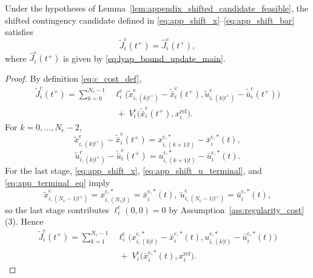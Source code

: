 \documentclass[twocolumn]{autart}
\begin{document}
\begin{lemma}
\label{lem:appendix_shifted_cost_identity}
Under the hypotheses of Lemma~\ref{lem:appendix_shifted_candidate_feasible}, the shifted contingency candidate defined in
\eqref{eq:app_shift_x}--\eqref{eq:app_shift_bar} satisfies
\begin{equation}
\tilde J_i^{\mathrm c}(t^+)
=
\hat J_i^{\mathrm c}(t^+),
\label{eq:app_candidate_equals_bound}
\end{equation}
where $\hat J_i^{\mathrm c}(t^+)$ is given by \eqref{eq:lyap_bound_update_main}.
\end{lemma}

\begin{proof}
By definition \eqref{eq:c_cost_def},
\begin{equation}
\begin{aligned}
\tilde J_i^{\mathrm c}(t^+)
=
\sum_{k=0}^{N_{\mathrm c}-1}
&\ell_i^{\mathrm c}\!\Big(
\tilde x_{i,(k|t^+)}^{\mathrm c}-\tilde{\bar x}_i^{\mathrm c}(t^+),
\tilde u_{i,(k|t^+)}^{\mathrm c}-\tilde{\bar u}_i^{\mathrm c}(t^+)
\Big)
\\
&\;+\;
V_i^{\mathrm c}\!\bigl(\tilde{\bar x}_i^{\mathrm c}(t^+),x_i^{\mathrm{ref}}\bigr).
\end{aligned}
\label{eq:app_shifted_candidate_cost}
\end{equation}
For $k=0,\dots,N_{\mathrm c}-2$,
\[
\tilde x_{i,(k|t^+)}^{\mathrm c}-\tilde{\bar x}_i^{\mathrm c}(t^+)
=
x_{i,(k+1|t)}^{\mathrm c,\ast}-\bar x_i^{\mathrm c,\ast}(t),
\]
\[
\tilde u_{i,(k|t^+)}^{\mathrm c}-\tilde{\bar u}_i^{\mathrm c}(t^+)
=
u_{i,(k+1|t)}^{\mathrm c,\ast}-\bar u_i^{\mathrm c,\ast}(t).
\]
For the last stage, \eqref{eq:app_shift_x}, \eqref{eq:app_shift_u_terminal}, and \eqref{eq:app_terminal_eq} imply
\[
\tilde x_{i,(N_{\mathrm c}-1|t^+)}^{\mathrm c}
=
x_{i,(N_{\mathrm c}|t)}^{\mathrm c,\ast}
=
\bar x_i^{\mathrm c,\ast}(t),
\ 
\tilde u_{i,(N_{\mathrm c}-1|t^+)}^{\mathrm c}
=
\bar u_i^{\mathrm c,\ast}(t),
\]
so the last stage contributes
\(
\ell_i^{\mathrm c}(0,0)=0
\)
by Assumption~\ref{ass:regularity_cost}(3). Hence
\begin{equation}
\begin{aligned}
\tilde J_i^{\mathrm c}(t^+)
=
\sum_{k=1}^{N_{\mathrm c}-1}
&\ell_i^{\mathrm c}\!\Big(
x_{i,(k|t)}^{\mathrm c,\ast}-\bar x_i^{\mathrm c,\ast}(t),
u_{i,(k|t)}^{\mathrm c,\ast}-\bar u_i^{\mathrm c,\ast}(t)
\Big)
\\
&\;+\;
V_i^{\mathrm c}\!\bigl(\bar x_i^{\mathrm c,\ast}(t),x_i^{\mathrm{ref}}\bigr).
\end{aligned}

\end{equation}
\end{proof}
\end{document}
